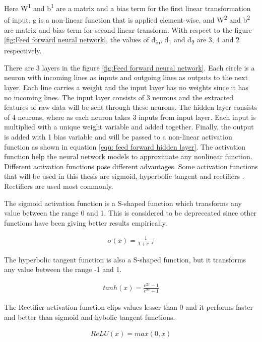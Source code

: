 \documentclass[a4paper, 11pt]{article}
\begin{document}
Here W\textsuperscript{1} and b\textsuperscript{1} are a matrix and a bias term for the first linear transformation of input, g is a non-linear function that is applied element-wise, and W\textsuperscript{2} and b\textsuperscript{2} are matrix and bias term for second linear transform. With respect to the figure \ref{fig:Feed forward neural network}, the values of d\textsubscript{in}, d\textsubscript{1} and d\textsubscript{2} are 3, 4 and 2 respectively. 

There are 3 layers in the figure \ref{fig:Feed forward neural network}. Each circle is a neuron with incoming lines as inputs and outgoing lines as outputs to the next layer. Each line carries a weight and the input layer has no weights since it has no incoming lines. The input layer consists of 3 neurons and the extracted features of raw data will be sent through these neurons. The hidden layer consists of 4 neurons, where as each neuron takes 3 inputs from input layer. Each input is multiplied with a unique weight variable and added together. Finally, the output is added with 1 bias variable and will be passed to a non-linear activation function as shown in equation \ref{equ: feed forward hidden layer}. The activation function help the neural network models to approximate any nonlinear function. Different activation functions pose different advantages. Some activation functions that will be used in this thesis are sigmoid, hyperbolic tangent and rectifiers \cite{Goldberg2016}. Rectifiers are used most commonly.

The sigmoid activation function is a S-shaped function which transforms any value between the range 0 and 1. This is considered to be depreceated since other functions have been giving better results empirically. 

\begin{align*}
\sigma (x) = \frac{1}{1 + e^{-x}}
\end{align*} 

The hyperbolic tangent function is also a S-shaped function, but it transforms any value between the range -1 and 1.

\begin{align*}
tanh(x) = \frac{e^{2x}-1}{e^{2x}+1}
\end{align*}

The Rectifier activation function clips values lesser than 0 and it performs faster and better than sigmoid and hybolic tangent functions.

\begin{align*}
ReLU(x) = max(0,x)
\end{align*}
\end{document}
